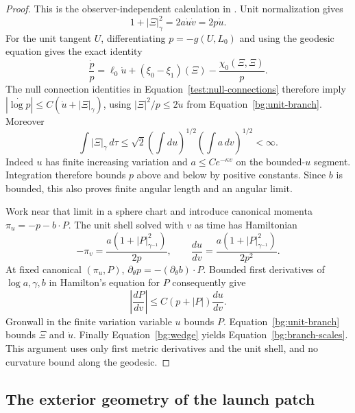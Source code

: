 \begin{proof}
This is the observer-independent calculation in
\cite[]{Foundation}.
Unit normalization gives
\begin{equation}\label{bg:unit-branch}
        1+|\Xi|_\gamma^2=2a\dot u\dot v=2p\dot u.
\end{equation}
For the unit tangent $U$, differentiating $p=-g(U,L_0)$ and
using the geodesic equation gives the exact identity
\[
 \frac{\dot p}{p}=\ell_0\dot u+(\xi_0-\xi_1)(\Xi)
                           -\frac{\chi_0(\Xi,\Xi)}p.
\]
The null connection identities in Equation~\eqref{test:null-connections} therefore imply
$|\dot{\log p}|\le C(\dot u+|\Xi|_\gamma)$, using
$|\Xi|^2/p\le2\dot u$ from Equation~\eqref{bg:unit-branch}.
Moreover
\[
 \int|\Xi|_\gamma\,d\tau
 \le\sqrt2\left(\int du\right)^{1/2}
                  \left(\int a\,dv\right)^{1/2}<\infty.
\]
Indeed $u$ has finite increasing variation and
$a\le Ce^{-\kappa v}$ on the bounded-$u$ segment.  Integration
therefore bounds $p$ above and below by positive constants.
Since $b$ is bounded, this also proves finite angular length and
an angular limit.

Work near that limit in a sphere chart and introduce canonical
momenta $\pi_u=-p-b\cdot P$.  The unit shell solved with $v$ as
time has Hamiltonian
\begin{equation}\label{bg:branch-hamiltonian}
 -\pi_v=\frac{a(1+|P|_{\gamma^{-1}}^2)}{2p},
 \qquad \frac{du}{dv}
       =\frac{a(1+|P|_{\gamma^{-1}}^2)}{2p^2}.
\end{equation}
At fixed canonical $(\pi_u,P)$, $\partial_\theta p
=-(\partial_\theta b)\cdot P$.  Bounded first derivatives of
$\log a,\gamma,b$ in Hamilton's equation for $P$ consequently give
\[
 \left|\frac{dP}{dv}\right|
        \le C(p+|P|)\frac{du}{dv}.
\]
Gronwall in the finite variation variable $u$ bounds $P$.
Equation~\eqref{bg:unit-branch} bounds $\Xi$ and $\dot u$.
Finally Equation~\eqref{bg:wedge} yields
Equation~\eqref{bg:branch-scales}.  This argument uses only first
metric derivatives and the unit shell, and no curvature bound along
the geodesic.
\end{proof}

\subsection{The exterior geometry of the launch patch}

